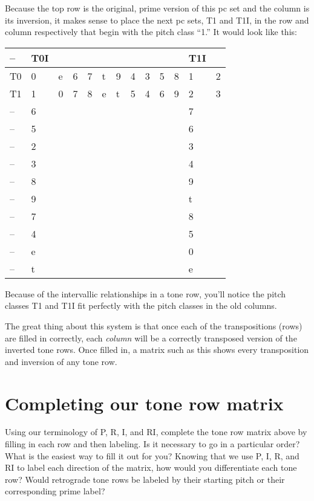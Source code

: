 \documentclass{book}
\begin{document}
Because the top row is the original, prime version of this pc set and the
column is its inversion, it makes sense to place the next pc sets, T1 and T1I,
in the row and column respectively that begin with the pitch class ``1.'' It
would look like this:

\begin{longtable}[]{@{}lllllllllllll@{}}
\toprule
-- & T0I & & & & & & & & & & T1I & \\
\midrule
\endhead
T0 & 0 & e & 6 & 7 & t & 9 & 4 & 3 & 5 & 8 & 1 & 2 \\
T1 & 1 & 0 & 7 & 8 & e & t & 5 & 4 & 6 & 9 & 2 & 3 \\
-- & 6 & & & & & & & & & & 7 & \\
-- & 5 & & & & & & & & & & 6 & \\
-- & 2 & & & & & & & & & & 3 & \\
-- & 3 & & & & & & & & & & 4 & \\
-- & 8 & & & & & & & & & & 9 & \\
-- & 9 & & & & & & & & & & t & \\
-- & 7 & & & & & & & & & & 8 & \\
-- & 4 & & & & & & & & & & 5 & \\
-- & e & & & & & & & & & & 0 & \\
-- & t & & & & & & & & & & e & \\
\bottomrule
\end{longtable}

Because of the intervallic relationships in a tone row, you'll notice the
pitch classes T1 and T1I fit perfectly with the pitch classes in the old
columns.

The great thing about this system is that once each of the transpositions
(rows) are filled in correctly, each \emph{column} will be a correctly
transposed version of the inverted tone rows. Once filled in, a matrix such as
this shows every transposition and inversion of any tone row.

\hypertarget{completing-our-tone-row-matrix}{%
\section{Completing our tone row
matrix}\label{completing-our-tone-row-matrix}}

Using our terminology of P, R, I, and RI, complete the tone row matrix above
by filling in each row and then labeling. Is it necessary to go in a
particular order? What is the easiest way to fill it out for you? Knowing that
we use P, I, R, and RI to label each direction of the matrix, how would you
differentiate each tone row? Would retrograde tone rows be labeled by their
starting pitch or their corresponding prime label?
\end{document}

